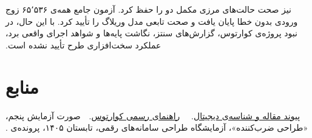 ‫نیز صحت حالت‌های مرزی مکمل دو را حفظ کرد. آزمون جامع همه‌ی ۶۵٬۵۳۶ زوج ورودی بدون خطا
‫پایان یافت و صحت تابعی مدل وریلاگ را تأیید کرد. با این حال، در نبود پروژه‌ی کوارتوس، گزارش‌های
‫سنتز، نگاشت پایه‌ها و شواهد اجرای واقعی برد، عملکرد سخت‌افزاری طرح تأیید نشده است.
‫
‫
‫\section{منابع}
‫
‫
‫
‫
‫\href{https://doi.org/10.1093/qjmam/4.2.236}{پیوند مقاله و شناسه‌ی دیجیتال}.
‫
‫
‫
‫\href{https://www.intel.com/content/www/us/en/support/programmable/support-resources/design-guidance/quartus-support.html}{راهنمای رسمی کوارتوس}.
‫
‫
‫صورت آزمایش پنجم، «طراحی ضرب‌کننده»، آزمایشگاه طراحی سامانه‌های رقمی، تابستان ۱۴۰۵،
‫پرونده‌ی .
‫
